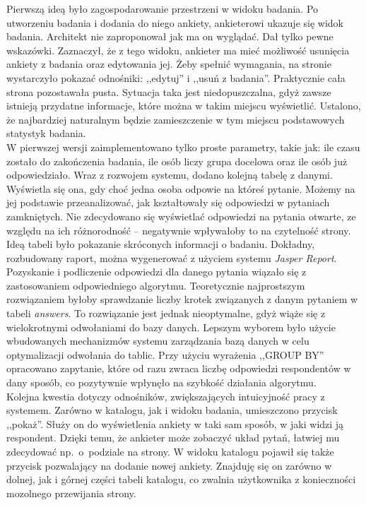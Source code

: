 Pierwszą ideą było zagospodarowanie przestrzeni w widoku badania. Po utworzeniu badania i dodania do niego ankiety, ankieterowi ukazuje się widok badania. Architekt nie zaproponował jak ma on wyglądać. Dał tylko pewne wskazówki. Zaznaczył, że z tego widoku, ankieter ma mieć możliwość usunięcia ankiety z badania oraz edytowania jej. Żeby spełnić wymagania, na stronie wystarczyło pokazać odnośniki: ,,edytuj'' i ,,usuń z badania''. Praktycznie cała strona pozostawała pusta. Sytuacja taka jest niedopuszczalna, gdyż zawsze istnieją przydatne informacje, które można w takim miejscu wyświetlić. Ustalono, że najbardziej naturalnym będzie zamieszczenie w tym miejscu podstawowych statystyk badania. \\

W pierwszej wersji zaimplementowano tylko proste parametry, takie jak: ile czasu zostało do zakończenia badania, ile osób liczy grupa docelowa oraz ile osób już odpowiedziało. Wraz z rozwojem systemu, dodano kolejną tabelę z danymi. Wyświetla się ona, gdy choć jedna osoba odpowie na któreś pytanie. Możemy na jej podstawie przeanalizować, jak kształtowały się odpowiedzi w pytaniach zamkniętych. Nie zdecydowano się wyświetlać odpowiedzi na pytania otwarte, ze względu na ich różnorodność -- negatywnie wpływałoby to na czytelność strony. Ideą tabeli było pokazanie skróconych informacji o badaniu. Dokładny, rozbudowany raport, można wygenerować z użyciem systemu \textit{Jasper Report}. \\

Pozyskanie i podliczenie odpowiedzi dla danego pytania wiązało się z zastosowaniem odpowiedniego algorytmu. Teoretycznie najprostszym rozwiązaniem byłoby sprawdzanie liczby krotek związanych z danym pytaniem w tabeli \textit{answers}. To rozwiązanie jest jednak nieoptymalne, gdyż wiąże się z wielokrotnymi odwołaniami do bazy danych. Lepszym wyborem było użycie wbudowanych mechanizmów systemu zarządzania bazą danych w celu optymalizacji odwołania do tablic. Przy użyciu wyrażenia ,,GROUP BY'' opracowano zapytanie, które od razu zwraca liczbę odpowiedzi respondentów w dany sposób, co pozytywnie wpłynęło na szybkość działania algorytmu. \\

Kolejna kwestia dotyczy odnośników, zwiększających intuicyjność pracy z systemem. Zarówno w katalogu, jak i widoku badania, umieszczono przycisk ,,pokaż''. Służy on do wyświetlenia ankiety w taki sam sposób, w jaki widzi ją respondent. Dzięki temu, że ankieter może zobaczyć układ pytań, łatwiej mu zdecydować np.~o~podziale na strony. W widoku katalogu pojawił się także przycisk pozwalający na dodanie nowej ankiety. Znajduję się on zarówno w dolnej, jak i górnej części tabeli katalogu, co zwalnia użytkownika z konieczności mozolnego przewijania strony. \\

